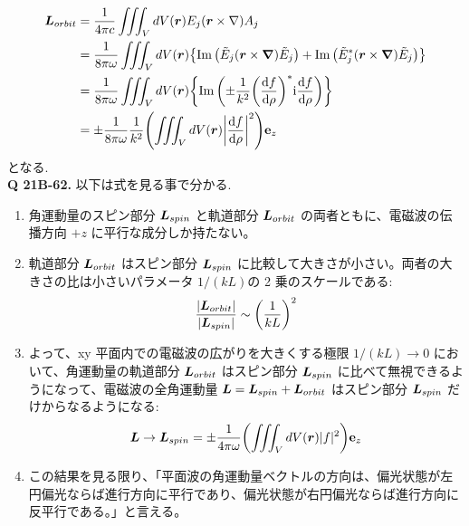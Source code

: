 \documentclass[a4paper,dvipdfmx]{jsarticle}
\theoremstyle{definition}
\begin{document}
\begin{align}
  \LL_{orbit} & = \frac{1}{4\pi c}\iiint_VdV(\rr)E_j(\rr\times\nabla)A_j                                                                   \\
              & = \frac{1}{8\pi\omega}\iiint_VdV(\rr)\qty{\Im\qty(\Et_j(\rr\times\vnabla)\Et_j) + \Im\qty(\Et_j^*(\rr\times\vnabla)\Et_j)} \\
              & = \frac{1}{8\pi\omega}\iiint_VdV(\rr)\qty{\Im\qty(\pm\frac{1}{k^2}\qty(\dv{f}{\rho})^*\ii\dv{f}{\rho})}                    \\
              & = \pm\frac{1}{8\pi\omega}\frac{1}{k^2}\qty(\iiint_VdV(\rr)\qty|\dv{f}{\rho}|^2)\vb{e}_z
\end{align}
となる. \\

\textbf{Q 21B-62.}
以下は式を見る事で分かる.
\begin{enumerate}
  \item 角運動量のスピン部分 $\vb*{L}_{spin}$ と軌道部分 $\vb*{L}_{orbit}$ の両者ともに、電磁波の伝播方向 $+z$ に平行な成分しか持たない。
  \item 軌道部分 $\vb*{L}_{orbit}$ はスピン部分 $\vb*{L}_{spin}$ に比較して大きさが小さい。両者の大きさの比は小さいパラメータ $1/(kL)$の 2 乗のスケールである:
        \begin{align}
          \frac{|\vb*{L}_{orbit}|}{|\vb*{L}_{spin}|} \sim \qty(\frac{1}{kL})^2
        \end{align}
  \item よって、xy 平面内での電磁波の広がりを大きくする極限 $1/(kL) \to 0$ において、角運動量の軌道部分 $\vb*{L}_{orbit}$ はスピン部分 $\vb*{L}_{spin}$ に比べて無視できるようになって、電磁波の全角運動量 $\vb*{L} = \vb*{L}_{spin} + \vb*{L}_{orbit}$ はスピン部分 $\vb*{L}_{spin}$ だけからなるようになる:
        \begin{align}
          \vb*{L} \to \vb*{L}_{spin} = \pm \frac{1}{4\pi\omega}\qty(\iiint_VdV(\vb*{r})|f|^2)\vb{e}_z \label{L limit}
        \end{align}
  \item この結果を見る限り、「平面波の角運動量ベクトルの方向は、偏光状態が左円偏光ならば進行方向に平行であり、偏光状態が右円偏光ならば進行方向に反平行である。」と言える。
\end{enumerate}
\end{document}
